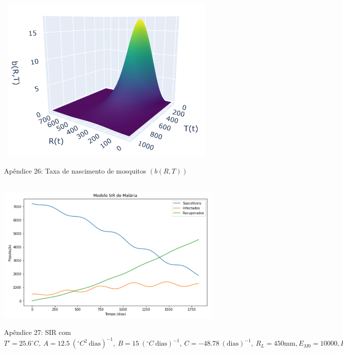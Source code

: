 \documentclass[12pt]{article}
\begin{document}
\begin{figure}[!ht]
        \centering
        \hbox{\hspace{2.7em} \includegraphics[scale=1.0] {Plot_b(R,T)_c1_c2_corrigido.png}}
        \caption*{Apêndice 26: Taxa de nascimento de mosquitos $(b(R,T))$} 
\end{figure} 
\newpage
\begin{figure}[!ht]
        \centering
        \hbox{\hspace{2.7em} \includegraphics[scale=0.7] {SIR_Entrada_Pop_10000_500_Infect.png}}
        \caption*{Apêndice 27: SIR com $T'=25.6^\circ C, \ A=12.5 \ (^\circ C^2 \ \text{dias})^{-1}, \ B=15 \ (^\circ C \ \text{dias})^{-1}, \ C=-48.78 \ (\text{dias})^{-1}, \ R_L=450 \text{mm}, E_{M0}=10000, I_{H0}=500$} 
\end{figure} 
\end{document}
